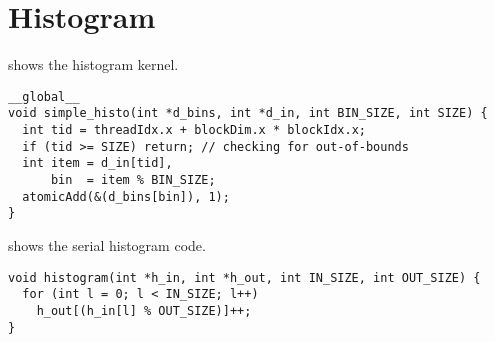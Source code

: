 \section{Histogram}
\label{sec:histogram}

 shows the histogram kernel.

\begin{lstlisting}[caption={Simple parallel histogram implementation}, label={lst:histo par}]
__global__ 
void simple_histo(int *d_bins, int *d_in, int BIN_SIZE, int SIZE) {
  int tid = threadIdx.x + blockDim.x * blockIdx.x;
  if (tid >= SIZE) return; // checking for out-of-bounds
  int item = d_in[tid], 
      bin  = item % BIN_SIZE;
  atomicAdd(&(d_bins[bin]), 1);
}
\end{lstlisting}

 shows the serial histogram code.

\begin{lstlisting}[caption={Serial histogram}, label={lst:hist seq}]
void histogram(int *h_in, int *h_out, int IN_SIZE, int OUT_SIZE) {
  for (int l = 0; l < IN_SIZE; l++) 
    h_out[(h_in[l] % OUT_SIZE)]++;
}
\end{lstlisting}
